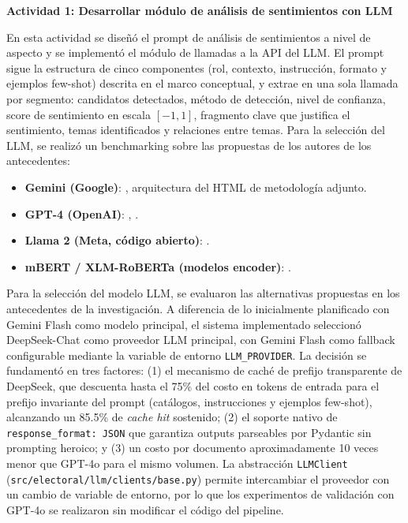 \documentclass[listof=nochaptergap,12pt,times,authoryear]{report}
\let\cite\textcite
\begin{document}
\textbf{Actividad 1: Desarrollar módulo de análisis de sentimientos con LLM}
 
En esta actividad se diseñó el prompt de análisis de sentimientos a nivel de aspecto y se
implementó el módulo de llamadas a la API del LLM. El prompt sigue la estructura de
cinco componentes (rol, contexto, instrucción, formato y ejemplos few-shot) descrita en el
marco conceptual, y extrae en una sola llamada por segmento: candidatos detectados,
método de detección, nivel de confianza, score de sentimiento en escala $[-1, 1]$,
fragmento clave que justifica el sentimiento, temas identificados y relaciones entre temas.
Para la selección del LLM, se realizó un benchmarking sobre las propuestas de los
autores de los antecedentes:
 
\begin{itemize}
    \item \textbf{Gemini (Google)}: \cite{pr_alvarez2023llm_political}, arquitectura del HTML de metodología adjunto.
    \item \textbf{GPT-4 (OpenAI)}: \cite{pr_gujral2024llm_elections}, \cite{pr_chen2024combating_misinformation}.
    \item \textbf{Llama 2 (Meta, código abierto)}: \cite{pr_gujral2024llm_elections}.
    \item \textbf{mBERT / XLM-RoBERTa (modelos encoder)}: \cite{pr_alvi2023twitter_election_review}.
\end{itemize}
 
Para la selección del modelo LLM, se evaluaron las alternativas propuestas en los antecedentes de la investigación. A diferencia de lo inicialmente planificado con Gemini Flash como modelo principal, el sistema implementado seleccionó DeepSeek-Chat como proveedor LLM principal, con Gemini Flash como fallback configurable mediante la variable de entorno \texttt{LLM\_PROVIDER}. La decisión se fundamentó en tres factores: (1) el mecanismo de caché de prefijo transparente de DeepSeek, que descuenta hasta el 75\% del costo en tokens de entrada para el prefijo invariante del prompt (catálogos, instrucciones y ejemplos few-shot), alcanzando un 85.5\% de \textit{cache hit} sostenido; (2) el soporte nativo de \texttt{response\_format: JSON} que garantiza outputs parseables por Pydantic sin prompting heroico; y (3) un costo por documento aproximadamente 10 veces menor que GPT-4o para el mismo volumen. La abstracción \texttt{LLMClient} (\texttt{src/electoral/llm/clients/base.py}) permite intercambiar el proveedor con un cambio de variable de entorno, por lo que los experimentos de validación con GPT-4o se realizaron sin modificar el código del pipeline.
 
\end{document}
